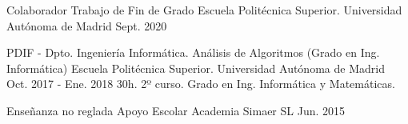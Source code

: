\begin{cventries}
   \cventry
	 {Colaborador} %
	 {Trabajo de Fin de Grado} %
	 {Escuela Politécnica Superior. Universidad Autónoma de Madrid} %
	 {Sept. 2020} %
	 {
	 	\begin{cvitems} %
	 		\item {}
	 	\end{cvitems}
	 }

  \cventry
    {PDIF - Dpto. Ingeniería Informática.} %
    {Análisis de Algoritmos (Grado en Ing. Informática)} %
    {Escuela Politécnica Superior. Universidad Autónoma de Madrid} %
    {Oct. 2017 - Ene. 2018} %
    {30h. 2º curso. Grado en Ing. Informática y Matemáticas.}
    
    

  \cventry
    {Enseñanza no reglada} %
    {Apoyo Escolar} %
    {Academia Simaer SL} %
    {Jun. 2015} %
    {}
    
\end{cventries}